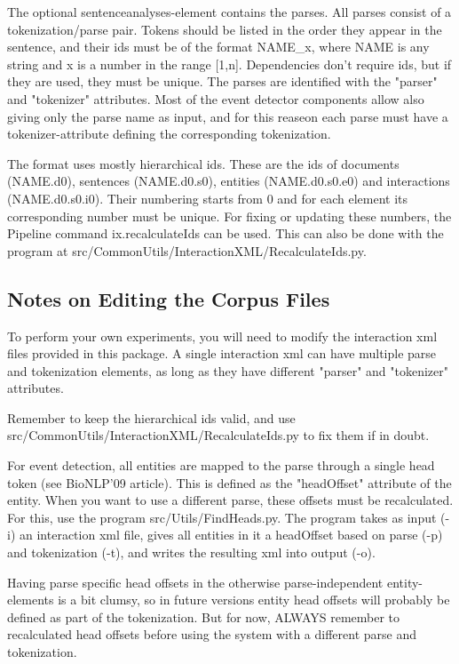 \documentclass[a4paper,12pt]{article}
\begin{document}
The optional sentenceanalyses-element contains the parses. All parses consist of a tokenization/parse pair. Tokens should be listed in the order they appear in the sentence, and their ids must be of the format NAME\_x, where NAME is any string and x is a number in the range [1,n]. Dependencies don't require ids, but if they are used, they must be unique. The parses are identified with the "parser" and "tokenizer" attributes. Most of the event detector components allow also giving only the parse name as input, and for this reaseon each parse must have a tokenizer-attribute defining the corresponding tokenization.

The format uses mostly hierarchical ids. These are the ids of documents (NAME.d0), sentences (NAME.d0.s0), entities (NAME.d0.s0.e0) and interactions (NAME.d0.s0.i0). Their numbering starts from 0 and for each element its corresponding number must be unique. For fixing or updating these numbers, the Pipeline command ix.recalculateIds can be used. This can also be done with the program at src/CommonUtils/InteractionXML/RecalculateIds.py.

\subsection{Notes on Editing the Corpus Files}

To perform your own experiments, you will need to modify the interaction xml files provided in this package. A single interaction xml can have multiple parse and tokenization elements, as long as they have different "parser" and "tokenizer" attributes.

Remember to keep the hierarchical ids valid, and use src/CommonUtils/InteractionXML/RecalculateIds.py to fix them if in doubt.

For event detection, all entities are mapped to the parse through a single head token (see BioNLP'09 article). This is defined as the "headOffset" attribute of the entity. When you want to use a different parse, these offsets must be recalculated. For this, use the program src/Utils/FindHeads.py. The program takes as input (-i) an interaction xml file, gives all entities in it a headOffset based on parse (-p) and tokenization (-t), and writes the resulting xml into output (-o).

Having parse specific head offsets in the otherwise parse-independent entity-elements is a bit clumsy, so in future versions entity head offsets will probably be defined as part of the tokenization. But for now, ALWAYS remember to recalculated head offsets before using the system with a different parse and tokenization.
\end{document}

